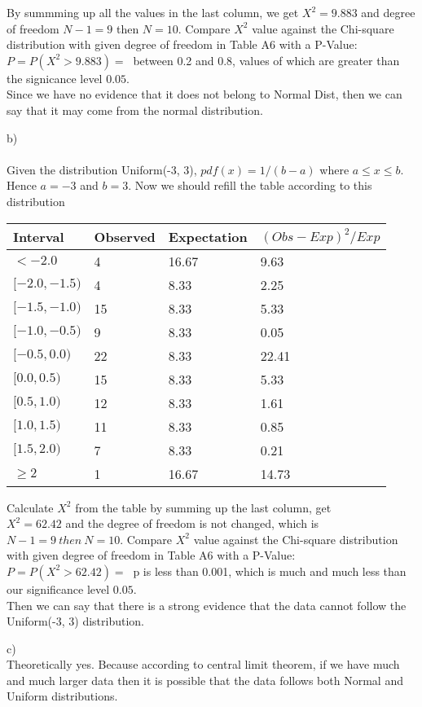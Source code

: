 \documentclass[12pt]{article}
\begin{document}
By summming up all the values in the last column, we get $X^2 = 9.883$ and degree of freedom $N - 1 = 9$ then $N = 10$. Compare $X^2$ value against the Chi-square distribution with given degree of freedom in Table A6 with a P-Value:\\
$P = P(X^2 > 9.883) =\ $ between 0.2 and 0.8, values of which are greater than the signicance level $0.05$.\\

Since we have no evidence that it does not belong to Normal Dist, then we can say that it may come from the normal distribution.

b)\\ \\
Given the distribution Uniform(-3, 3), $pdf(x) = 1 / (b-a)$ where $a \leq x \leq b$. Hence $a=-3$ and $b=3$. Now we should refill the table according to this distribution\\

\begin{center}
    \begin{tabular}{| l | l | l | l |} 
    \hline
        Interval       & Observed & Expectation & $(Obs-Exp)^2 / Exp$\\\hline
        $< -2.0$       & 4        & 16.67       & 9.63               \\\hline
        $[-2.0, -1.5)$ & 4        & 8.33        & 2.25               \\\hline
        $[-1.5, -1.0)$ & 15       & 8.33        & 5.33               \\\hline 
        $[-1.0, -0.5)$ & 9        & 8.33        & 0.05               \\\hline
        $[-0.5, 0.0)$  & 22       & 8.33        & 22.41              \\\hline
        $[0.0, 0.5)$   & 15       & 8.33        & 5.33               \\\hline
        $[0.5, 1.0)$   & 12       & 8.33        & 1.61               \\\hline
        $[1.0, 1.5)$   & 11       & 8.33        & 0.85               \\\hline
        $[1.5, 2.0)$   & 7        & 8.33        & 0.21               \\\hline
        $\geq 2$       & 1        & 16.67       & 14.73              \\\hline
    \end{tabular}
\end{center}

Calculate $X^2$ from the table by summing up the last column, get\\
$X^2 = 62.42$ and the degree of freedom is not changed, which is $N - 1 = 9\ then\ N = 10$.
Compare $X^2$ value against the Chi-square distribution with given degree of freedom in Table A6 with a P-Value:\\
$P = P(X^2 > 62.42) =\ $ p is less than 0.001, which is much and much less than our significance level $0.05$.\\
Then we can say that there is a strong evidence that the data cannot follow the Uniform(-3, 3) distribution.

c)\\
Theoretically yes. Because according to central limit theorem, if we have much and much larger data then it is possible that the data follows both Normal and Uniform distributions.
\end{document}
